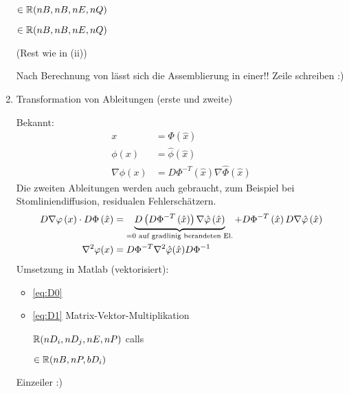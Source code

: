 \begin{enumerate}


 $\in \R(nB, nB, nE, nQ)$



 $\in \R(nB, nB, nE, nQ)$


 (Rest wie in (ii))

\begin{bemerkung}
  Nach Berechnung von  lässt sich die Assemblierung in einer!! Zeile schreiben :)
\end{bemerkung}
\item Transformation von Ableitungen (erste und zweite)

Bekannt: 
\begin{align}
  x &= \Phi(\hat x) \label{eq:arg}\\
\phi(x) &= \hat \phi (\hat x) \label{eq:D0}\\
\nabla \phi(x) &= D\Phi^{-T}(\hat x)\nabla\hat \Phi(\hat x) \label{eq:D1}
\end{align}
Die zweiten Ableitungen werden auch gebraucht, zum Beispiel bei Stomliniendiffusion, residualen Fehlerschätzern. 
\begin{align}
  D\nabla\phi\left(x\right) \cdot D \Phi\left(\hat x\right)&= \underbrace{D\left(D\Phi^{-T}\left(\hat x\right)\right) \nabla \hat\phi\left(\hat x\right)}_{= 0 \text{ auf gradlinig berandeten El.}} + D\Phi^{-T}\left(\hat x\right) D \nabla \hat \phi \left(\hat x\right) \notag\\
\nabla^{2}\phi(x) &= D\Phi^{-T}\nabla^{2}\hat\phi(\hat x) D \Phi^{-1} \label{eq:D2}
\end{align}
Umsetzung in Matlab (vektorisiert): 
\begin{itemize}
\item \eqref{eq:D0} 
\item \eqref{eq:D1} Matrix-Vektor-Multiplikation

 \in $\R(nD_{i}, nD_{j}, nE, nP)$ calls 


 $\in \R(nB, nP, bD_{i})$ 



\end{itemize}
\begin{bemerkung}
  Einzeiler :)
\end{bemerkung}
\end{enumerate}
